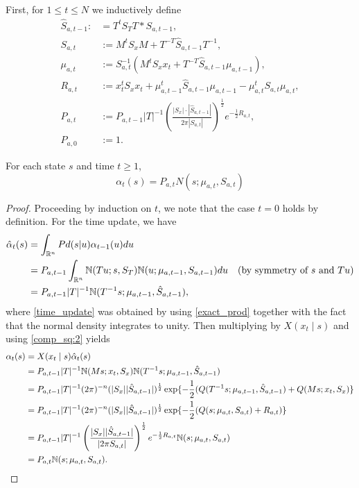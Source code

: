 \documentclass[12pt,leqno]{article}
\begin{document}
  First, for $1\le t \le N$ we inductively define
  \begin{align*}
    \hat{S}_{a,t-1} :&= T^{t}S_TT * S_{a,t-1},\\
    S_{a,t} &:= M^tS_xM  + T^{-T}\hat{S}_{a,t-1}T^{-1},\\
    \mu_{a,t} &:= S_{a,t}^{-1}(M^tS_xx_t + T^{-T}\hat{S}_{a,t-1}\mu_{a,t-1}),\\
    R_{a,t} &:= x_t^tS_xx_t + \mu_{a,t-1}^t\hat{S}_{a,t-1}\mu_{a,t-1} - \mu_{a,t}^tS_{a,t}\mu_{a,t},\\
    P_{a,t} &:= P_{a,t-1}|T|^{-1}\left(\frac{|S_x|\cdot|\hat{S}_{a,t-1}|}{2\pi|S_{a,t}|}\right)^{\frac{1}{2}}e^{-\frac{1}{2}R_{a,t}},\\
    P_{a,0} &:= 1.
  \end{align*}

\begin{Thm}\label{alpha:1}
  For each state $s$ and time $t \ge 1$,
$$
  \alpha_t(s) = P_{a,t}N(s;\mu_{a,t},S_{a,t})
$$
\end{Thm}

\begin{proof}

Proceeding by induction on $t$, we note that the case $t = 0$ holds by definition.
For the time update, we have
\begin{align}
  \hat{\alpha}_t(s) &= \int_{\R^n}Pd(s|u)\alpha_{t-1}(u)du \notag \\
  &= P_{a,t-1}\int_{\R^n}\N(Tu;s,S_T)\N(u;\mu_{a,t-1},S_{a,t-1})du \quad\text{(by symmetry of $s$ and $Tu$)}\notag\\
  &= P_{a,t-1}|T|^{-1}\N(T^{-1}s;\mu_{a,t-1},\hat{S}_{a,t-1}),\label{time_update} %
\end{align}
where \eqref{time_update} was obtained by using \eqref{exact_prod} together with the fact that the normal
density integrates to unity.  Then multiplying by $X(x_t\mid s)$ and using \eqref{comp_sq:2} yields
\begin{align*}
  \alpha_t(s) &= X(x_t\mid s)\hat{\alpha}_t(s) \\
  &= P_{a,t-1}|T|^{-1}{\mathbb N}(Ms;x_t,S_x){\mathbb N}(T^{-1}s;\mu_{a,t-1},\hat{S}_{a,t-1}) \\
  &= P_{a,t-1}|T|^{-1}(2\pi)^{-n}(|S_x||\hat{S}_{a,t-1}|)^{\frac{1}{2}}\exp\{-\frac{1}{2}(Q(T^{-1}s;
  \mu_{a,t-1},\hat{S}_{a,t-1}) + Q(Ms;x_t,S_x)\} \\
  &= P_{a,t-1}|T|^{-1}(2\pi)^{-n}(|S_x||\hat{S}_{a,t-1}|)^{\frac{1}{2}}\exp\{-\frac{1}{2}(Q(s;\mu_{a,t},S_{a,t}) + R_{a,t})\}\\
  &= P_{a,t-1}|T|^{-1}\left(\frac{|S_x||\hat{S}_{a,t-1}|}{|2\pi S_{a,t}|}\right)^{\frac{1}{2}}e^{-\frac{1}{2}R_{a,t}}
  {\mathbb N}(s;\mu_{a,t},S_{a,t})\\
  &= P_{a,t}{\mathbb N}(s;\mu_{a,t},S_{a,t}).
\end{align*}
\end{proof}
\end{document}
